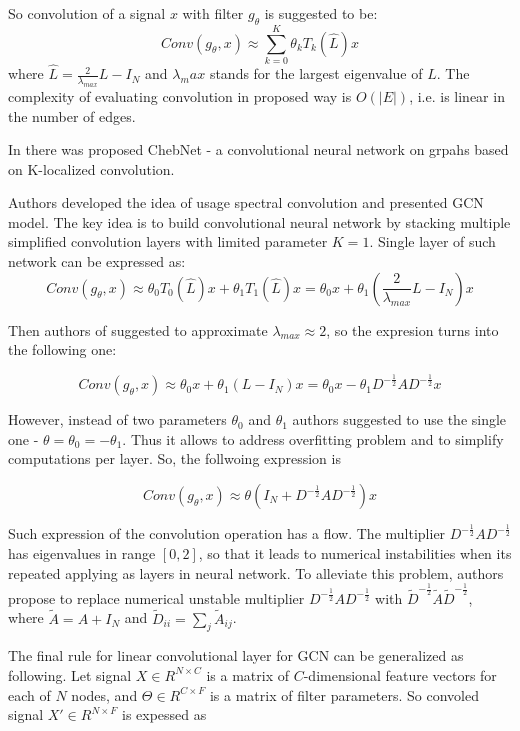 So convolution of a signal $x$ with filter $g_\theta$ is suggested to be:
\[
    Conv(g_\theta,x) \approx \sum_{k=0}^{K}{\theta}_k T_k(\hat{L})x
\]
where
$\hat{L} = \frac{2}{\lambda_{max}}L-I_N$ and $\lambda_max$ stands for the largest eigenvalue of $L$.
The complexity of evaluating convolution in proposed way is $O(|E|)$, i.e. is linear in the number of edges.

In \cite{ChebNet} there was proposed ChebNet - a convolutional neural network on grpahs based on K-localized convolution.

Authors \cite{GCN} developed the idea of usage spectral convolution and presented GCN model. The key idea is to build
convolutional neural network by stacking multiple simplified convolution layers with limited parameter $K=1$.
Single layer of such network can be expressed as: 
\[
    Conv(g_\theta,x) \approx {\theta}_0 T_0(\hat{L})x + {\theta}_1 T_1(\hat{L})x = {\theta}_0 x + {\theta}_1 (\frac{2}{\lambda_{max}}L-I_N)x
\]

Then authors of \cite{GCN} suggested to approximate $\lambda_{max} \approx 2$, so the expresion turns into the following one:

\[
    Conv(g_\theta,x) \approx {\theta}_0 x + {\theta}_1 (L-I_N)x = {\theta}_0 x - {\theta}_1 D^{-\frac{1}{2}}AD^{-\frac{1}{2}}x
\]

However, instead of two parameters $\theta_0$ and $\theta_1$ authors suggested to use the single one - $\theta = \theta_0 = -\theta_1$. Thus it allows to
address overfitting problem and to simplify computations per layer. So, the follwoing expression is

\[
    Conv(g_\theta,x) \approx {\theta}(I_N + D^{-\frac{1}{2}}AD^{-\frac{1}{2}})x
\]

Such expression of the convolution operation has a flow. The multiplier  $D^{-\frac{1}{2}}AD^{-\frac{1}{2}}$ has eigenvalues in 
range $[0,2]$, so that it leads to numerical instabilities when its repeated applying as layers in neural network. To alleviate this
problem, authors propose to replace numerical unstable multiplier $D^{-\frac{1}{2}}AD^{-\frac{1}{2}}$
with $\tilde{D}^{-\frac{1}{2}}\tilde{A}\tilde{D}^{-\frac{1}{2}}$, where $\tilde{A}=A+I_N$ and $\tilde{D}_{ii}=\sum_{j}\tilde{A}_{ij}$.

The final rule for linear convolutional layer for GCN can be generalized as following. Let signal $X \in R^{N\times C}$ is a matrix of $C$-dimensional
feature vectors for each of $N$ nodes, and $\Theta \in R^{C \times F}$ is a matrix of filter parameters. So convoled signal $X' \in R^{N \times F}$ is 
expessed as 

